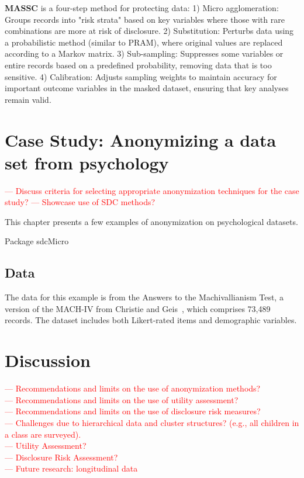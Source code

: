 \documentclass{article}
\begin{document}
\textbf{MASSC} is a four-step method for protecting data: 1) Micro agglomeration: Groups records into "risk strata" based on key variables where those with rare combinations are more at risk of disclosure.
2) Substitution: Perturbs data using a probabilistic method (similar to PRAM), where original values are replaced according to a Markov matrix.
3) Sub-sampling: Suppresses some variables or entire records based on a predefined probability, removing data that is too sensitive.
4) Calibration: Adjusts sampling weights to maintain accuracy for important outcome variables in the masked dataset, ensuring that key analyses remain valid.


\section{Case Study: Anonymizing a data set from psychology}

\textcolor{red}{— Discuss criteria for selecting appropriate anonymization techniques for the case study?}
\textcolor{red}{— Showcase use of SDC methods?}

This chapter presents a few examples of anonymization on psychological datasets. 

Package sdcMicro~\cite{2024_Sdcmicro}

\subsection{Data}
The data for this example is from the Answers to the Machivallianism Test, a version of the MACH-IV from Christie and Geis~\cite{Data}, which comprises 73,489 records.
The dataset includes both Likert-rated items and demographic variables.

\section{Discussion}

\textcolor{red}{— Recommendations and limits on the use of anonymization methods?} \\
\textcolor{red}{— Recommendations and limits on the use of utility assessment?} \\
\textcolor{red}{— Recommendations and limits on the use of disclosure risk measures?} \\
\textcolor{red}{— Challenges due to hierarchical data and cluster structures? (e.g., all children in a class are surveyed).} \\
\textcolor{red}{— Utility Assessment?} \\
\textcolor{red}{— Disclosure Risk Assessment?} \\ 
\textcolor{red}{— Future research: longitudinal data} \\
\end{document}

